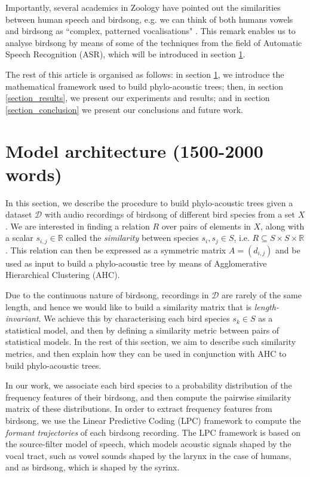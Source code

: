 \documentclass[pdftex,11pt,a4paper]{article}
\theoremstyle{definition}
\theoremstyle{remark}
\begin{document}
\par Importantly, several academics in Zoology have pointed out the similarities between human speech and birdsong, e.g. we can think of both humans vowels and birdsong as ``complex, patterned vocalisations" \cite{Berwick2013,Naguib2014}. This remark enables us to analyse birdsong by means of some of the techniques from the field of Automatic Speech Recognition (ASR), which will be introduced in section \ref{section_model}. 
\par The rest of this article is organised as follows: in section \ref{section_model}, we introduce the mathematical framework used to build phylo-acoustic trees; then, in section \ref{section_results}, we present our experiments and results; and in section \ref{section_conclusion} we present our conclusions and future work.

\section{Model architecture (1500-2000 words)}
\label{section_model}
In this section, we describe the procedure to build phylo-acoustic trees given a dataset $\mathcal{D}$ with audio recordings of birdsong of different bird species from a set $X$. We are interested in finding a relation $R$ over pairs of elements in $X$, along with a scalar $s_{i, j} \in \mathbb{R}$ called the \emph{similarity} between species $s_i, s_j \in S$, i.e. $R \subseteq S \times S \times \mathbb{R}$. This relation can then be expressed as a symmetric matrix $A = (d_{i,j})$ and be used as input to build a phylo-acoustic tree by means of Agglomerative Hierarchical Clustering (AHC). 
\par Due to the continuous nature of birdsong, recordings in $\mathcal{D}$ are rarely of the same length, and hence we would like to build a similarity matrix that is \emph{length-invariant}. We achieve this by characterising each bird species $s_k \in S$ as a statistical model, and then by defining a similarity metric between pairs of statistical models. In the rest of this section, we aim to describe such similarity metrics, and then explain how they can be used in conjunction with AHC to build phylo-acoustic trees.
\par In our work, we associate each bird species to a probability distribution of the frequency features of their birdsong, and then compute the pairwise similarity matrix of these distributions. In order to extract frequency features from birdsong, we use the Linear Predictive Coding (LPC) framework to compute the \emph{formant trajectories} of each birdsong recording. The LPC framework is based on the source-filter model of speech, which models acoustic signals shaped by the vocal tract, such as vowel sounds shaped by the larynx in the case of humans, and as birdsong, which is shaped by the syrinx.
\end{document}
